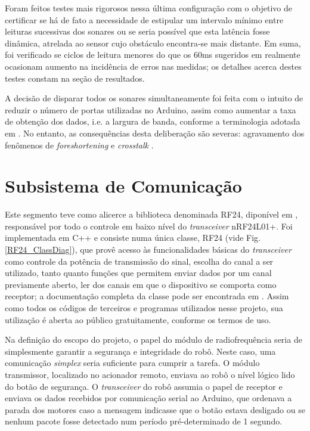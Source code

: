 Foram feitos testes mais rigorosos nessa última configuração com o objetivo de certificar se há de fato a necessidade de estipular um intervalo 
mínimo entre leituras sucessivas dos sonares ou se seria possível que esta latência fosse dinâmica, atrelada ao sensor cujo obstáculo encontra-se mais 
distante.
Em suma, foi verificado se ciclos de leitura menores do que os 60ms sugeridos em \cite{HC-SR04} realmente ocasionam aumento na incidência de erros 
nas medidas; os detalhes acerca destes testes constam na seção de resultados.

A decisão de disparar todos os sonares simultaneamente foi feita com o intuito de reduzir o número de portas utilizadas no Arduino, assim como 
aumentar a taxa de obtenção dos dados, i.e. a largura de banda, conforme a terminologia adotada  em \cite{roseli}.
No entanto, as consequências desta deliberação são  severas: agravamento dos fenômenos de \textit{foreshortening} e \textit{crosstalk} 
\cite{2016_artigo_5}. %

\section{Subsistema de Comunicação}
Este segmento teve como alicerce a biblioteca denominada RF24, diponível em \cite{nrf_lib}, responsável por todo o controle em baixo nível do 
\textit{transceiver} nRF24L01+.
Foi implementada em C++ e consiste numa única classe, RF24 (vide Fig.\ref{RF24_ClassDiag}), que provê acesso às funcionalidades básicas do 
\textit{transceiver} como controle da potência de transmissão do sinal, escolha do canal a ser utilizado, tanto quanto funções que permitem enviar 
dados por um canal previamente aberto, ler dos canais em que o dispositivo se comporta como receptor; a documentação completa da classe pode ser 
encontrada em \cite{RF24_class_doc}.
Assim como todos os códigos de terceiros e programas utilizados nesse projeto, sua utilização é aberta ao público gratuitamente, conforme os termos 
de uso.

Na definição do escopo do projeto, o papel do módulo de radiofrequência seria de simplesmente garantir a segurança e integridade do robô.
Neste caso, uma comunicação \textit{simplex} seria suficiente para cumprir a tarefa.
O módulo transmissor, localizado no acionador remoto, enviava ao robô o nível lógico lido do botão de segurança.
O \textit{transceiver} do robô assumia o papel de receptor e enviava os dados recebidos por comunicação serial ao Arduino, que ordenava a parada dos 
motores caso a mensagem indicasse que o botão estava desligado ou se nenhum pacote fosse detectado num período pré-determinado de 1 segundo.


